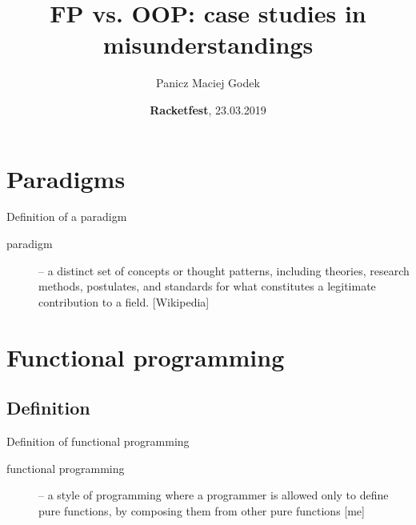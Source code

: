 \documentclass{beamer}
\title{\textbf{FP vs. OOP: case studies in misunderstandings}}
\author{Panicz Maciej Godek}
\institute{
  \tiny{\href{mailto:godek.maciek@gmail.com}{\textbf{godek.maciek@gmail.com}}}
}
\date{\textbf{Racketfest}, 23.03.2019}
\begin{document}
\begin{frame}
  \titlepage
\end{frame}

\section{Paradigms}

\begin{frame}{Definition of a paradigm}
  \begin{description}
  \item [paradigm] -- a distinct set of concepts or thought
    patterns, including theories, research methods, postulates,
    and standards for what constitutes a legitimate contribution
    to a field. [Wikipedia]
  \end{description}
\end{frame}

\section{Functional programming}

\subsection{Definition}

\begin{frame}{Definition of functional programming}
  \begin{description}
  \item [functional programming] -- a style of programming
    where a programmer is allowed only to define pure functions,
    by composing them from other pure functions [me]
  \end{description}
\end{frame}
\end{document}
